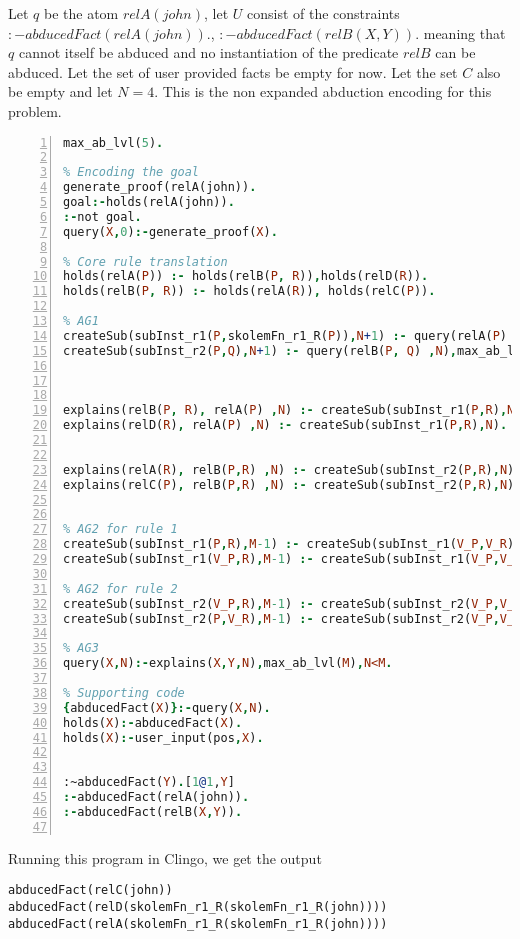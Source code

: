 \documentclass[sigconf]{acmart}
\begin{document}
Let $q$ be the atom $relA(john)$, let $U$ consist of the constraints $:-abducedFact(relA(john)).$, $:-abducedFact(relB(X,Y)).$ meaning that $q$ cannot itself be abduced and no instantiation of the predicate $relB$ can be abduced. Let the set of user provided facts be empty for now. Let the set $C$ also be empty and let $N = 4$. This is the non expanded abduction encoding for this problem. 
\begin{lstlisting}[language=Prolog, numbers=left]
max_ab_lvl(5).

% Encoding the goal
generate_proof(relA(john)).
goal:-holds(relA(john)).
:-not goal.
query(X,0):-generate_proof(X).

% Core rule translation
holds(relA(P)) :- holds(relB(P, R)),holds(relD(R)).
holds(relB(P, R)) :- holds(relA(R)), holds(relC(P)).

% AG1
createSub(subInst_r1(P,skolemFn_r1_R(P)),N+1) :- query(relA(P) ,N),max_ab_lvl(M),N<M-1.
createSub(subInst_r2(P,Q),N+1) :- query(relB(P, Q) ,N),max_ab_lvl(M),N<M-1.



explains(relB(P, R), relA(P) ,N) :- createSub(subInst_r1(P,R),N).
explains(relD(R), relA(P) ,N) :- createSub(subInst_r1(P,R),N).


explains(relA(R), relB(P,R) ,N) :- createSub(subInst_r2(P,R),N).
explains(relC(P), relB(P,R) ,N) :- createSub(subInst_r2(P,R),N).


% AG2 for rule 1
createSub(subInst_r1(P,R),M-1) :- createSub(subInst_r1(V_P,V_R),N), holds(relB(P, R)),max_ab_lvl(M).
createSub(subInst_r1(V_P,R),M-1) :- createSub(subInst_r1(V_P,V_R),N), holds(relD(R)),max_ab_lvl(M).

% AG2 for rule 2
createSub(subInst_r2(V_P,R),M-1) :- createSub(subInst_r2(V_P,V_R),N), holds(relA(R)),max_ab_lvl(M).
createSub(subInst_r2(P,V_R),M-1) :- createSub(subInst_r2(V_P,V_R),N), holds(relC(P)),max_ab_lvl(M).

% AG3
query(X,N):-explains(X,Y,N),max_ab_lvl(M),N<M.

% Supporting code
{abducedFact(X)}:-query(X,N).
holds(X):-abducedFact(X).
holds(X):-user_input(pos,X).


:~abducedFact(Y).[1@1,Y]
:-abducedFact(relA(john)).
:-abducedFact(relB(X,Y)).


\end{lstlisting}
Running this program in Clingo, we get the output 
\begin{verbatim}
abducedFact(relC(john))
abducedFact(relD(skolemFn_r1_R(skolemFn_r1_R(john))))
abducedFact(relA(skolemFn_r1_R(skolemFn_r1_R(john))))    
\end{verbatim}
\end{document}
